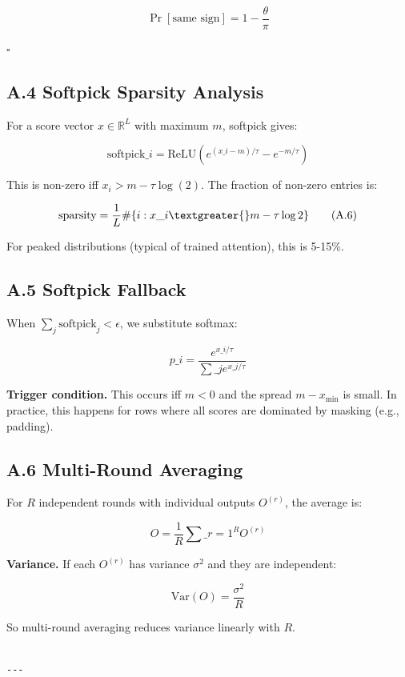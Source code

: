 \[
\Pr[\text{same sign}] = 1 - \frac{\theta}{\pi}
\]

$\square$

\subsection{A.4 Softpick Sparsity Analysis}

For a score vector $x \in \mathbb{R}^L$ with maximum $m$, softpick gives:

\[
\text{softpick}\_i = \text{ReLU}(e^{(x\_i - m)/\tau} - e^{-m/\tau})
\tag{A.5}
\]

This is non-zero iff $x_i > m - \tau \log(2)$. The fraction of non-zero 
entries is:

\[
\text{sparsity} = \frac{1}{L} \#\{i : x\_i \textgreater{} m - \tau \log 2\}
\tag{A.6}
\]

For peaked distributions (typical of trained attention), this is 5-15\%.

\subsection{A.5 Softpick Fallback}

When $\sum_j \text{softpick}_j < \epsilon$, we substitute softmax:

\[
p\_i = \frac{e^{x\_i / \tau}}{\sum\_j e^{x\_j / \tau}}
\tag{A.7}
\]

\textbf{Trigger condition.} This occurs iff $m < 0$ and the spread 
$m - x_\text{min}$ is small. In practice, this happens for rows where all 
scores are dominated by masking (e.g., padding).

\subsection{A.6 Multi-Round Averaging}

For $R$ independent rounds with individual outputs $O^{(r)}$, the average 
is:

\[
O = \frac{1}{R} \sum\_{r=1}^{R} O^{(r)}
\tag{A.8}
\]

\textbf{Variance.} If each $O^{(r)}$ has variance $\sigma^2$ and they are 
independent:

\[
\mathrm{Var}(O) = \frac{\sigma^2}{R}
\tag{A.9}
\]

So multi-round averaging reduces variance linearly with $R$.
\begin{lstlisting}

---
\end{lstlisting}